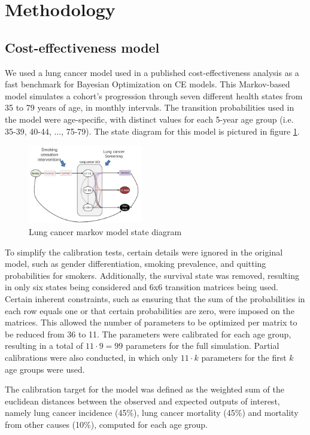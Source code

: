 \documentclass{IOS-Book-Article}
\begin{document}
	\section{Methodology}
	\subsection{Cost-effectiveness model}
	We used a lung cancer model used in a published cost-effectiveness analysis\cite{lung-model} as a fast benchmark for Bayesian Optimization on CE models. This Markov-based model simulates a cohort's progression through seven different health states from 35 to 79 years of age, in monthly intervals. The transition probabilities used in the model were age-specific, with distinct values for each 5-year age group (i.e. 35-39, 40-44, ..., 75-79). The state diagram for this model is pictured in figure \ref{fig:lung_model}.
	
	\begin{figure}[h!]
		\centering	
		\includegraphics[width=50mm]{figs/lungmodel.png}		
		\caption{Lung cancer markov model state diagram}	
		\label{fig:lung_model}	
	\end{figure}
	
	To simplify the calibration tests, certain details were ignored in the original model, such as gender differentiation, smoking prevalence, and quitting probabilities for smokers. Additionally, the survival state was removed, resulting in only six states being considered and 6x6 transition matrices being used. Certain inherent constraints, such as ensuring that the sum of the probabilities in each row equals one or that certain probabilities are zero, were imposed on the matrices. This allowed the number of parameters to be optimized per matrix to be reduced from 36 to 11. The parameters were calibrated for each age group, resulting in a total of $11\cdot 9=99$ parameters for the full simulation. Partial calibrations were also conducted, in which only $11\cdot k$ parameters for the first $k$ age groups were used.
	
	The calibration target for the model was defined as the weighted sum of the euclidean distances between the observed and expected outputs of interest, namely lung cancer incidence (45\%), lung cancer mortality (45\%) and mortality from other causes (10\%), computed for each age group.
	
\end{document}
